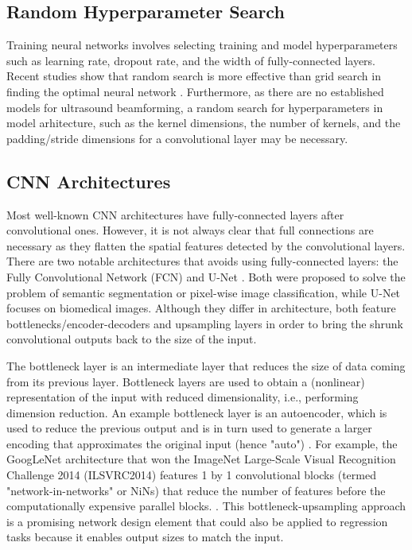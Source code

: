     \subsection{Random Hyperparameter Search}
      Training neural networks involves selecting training and model hyperparameters such as learning rate, dropout rate, and the width of fully-connected layers. Recent studies show that random search is more effective than grid search in finding the optimal neural network \cite{bergstra2012random}. Furthermore, as there are no established models for ultrasound beamforming, a random search for hyperparameters in model arhitecture, such as the kernel dimensions, the number of kernels, and the padding/stride dimensions for a convolutional layer may be necessary.

    \subsection{CNN Architectures}
      Most well-known CNN architectures have fully-connected layers after convolutional ones. However, it is not always clear that full connections are necessary as they flatten the spatial features detected by the convolutional layers. There are two notable architectures that avoids using fully-connected layers: the Fully Convolutional Network (FCN) \cite{long2015fcn} and U-Net \cite{ronneberger2015unet}. Both were proposed to solve the problem of semantic segmentation or pixel-wise image classification, while U-Net focuses on biomedical images. Although they differ in architecture, both feature bottlenecks/encoder-decoders and upsampling layers in order to bring the shrunk convolutional outputs back to the size of the input.

      The bottleneck layer is an intermediate layer that reduces the size of data coming from its previous layer. Bottleneck layers are used to obtain a (nonlinear) representation of the input with reduced dimensionality, i.e., performing dimension reduction. An example bottleneck layer is an autoencoder, which is used to reduce the previous output and is in turn used to generate a larger encoding that approximates the original input (hence "auto") \cite{ballard1987modular}. For example, the GoogLeNet architecture that won the ImageNet Large-Scale Visual Recognition Challenge 2014 (ILSVRC2014) features 1 by 1 convolutional blocks (termed "network-in-networks" or NiNs) that reduce the number of features before the computationally expensive parallel blocks. \cite{szegedy2015going}. This bottleneck-upsampling approach is a promising network design element that could also be applied to regression tasks because it enables output sizes to match the input.

